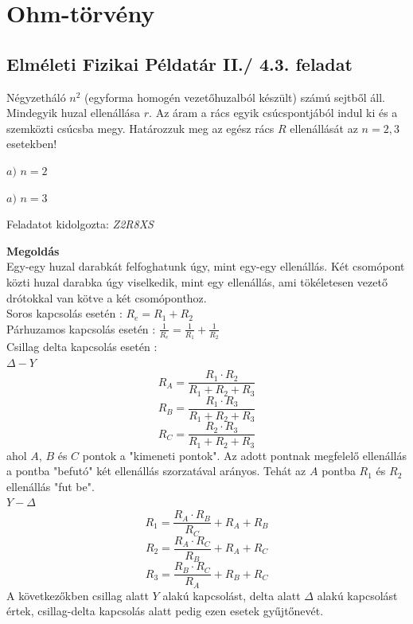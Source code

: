 \documentclass[11pt,a4paper,openany,leqno]{article}
\begin{document}
\section{Ohm-törvény}
\subsection{Elméleti Fizikai Példatár II./ 4.3. feladat}



Négyzetháló $n^2$ (egyforma homogén vezetőhuzalból készült) számú sejtből áll. Mindegyik huzal ellenállása $r$. Az áram a rács egyik csúcspontjából indul ki és a szemközti csúcsba megy. Határozzuk meg az egész rács $R$ ellenállását az $n = 2, 3$ esetekben!

\medskip
$a)$ $n = 2$

\medskip
$a)$ $n = 3$


\begin{flushright} {Feladatot kidolgozta: {\it Z2R8XS}} \end{flushright}

\vspace{0.5cm}

\textbf{Megoldás}\\
\indent
Egy-egy huzal darabkát felfoghatunk úgy, mint egy-egy ellenállás. Két csomópont közti huzal darabka úgy viselkedik, mint egy ellenállás, ami tökéletesen vezető drótokkal van kötve a két csomóponthoz.\\ \indent
Soros kapcsolás esetén : $R_e = R_1 + R_2$ \\ \indent
Párhuzamos kapcsolás esetén : $\frac{1}{R_e} = \frac{1}{R_1} + \frac{1}{R_2}$ \\ \indent
Csillag delta kapcsolás esetén : \\
\smallskip
\indent
$\Delta - Y$
$$ R_A = \frac{R_1 \cdot R_2}{R_1 + R_2 + R_3} $$
$$ R_B = \frac{R_1 \cdot R_3}{R_1 + R_2 + R_3} $$
$$ R_C = \frac{R_2 \cdot R_3}{R_1 + R_2 + R_3} $$ \indent
ahol $A$, $B$ és $C$ pontok a "kimeneti pontok". Az adott pontnak megfelelő ellenállás a pontba "befutó" két ellenállás szorzatával arányos. Tehát az $A$ pontba $R_1$ és $R_2$ ellenállás "fut be".\\ \indent
\smallskip
$Y- \Delta$
$$ R_1 = \frac{R_A \cdot R_B}{R_C} + R_A + R_B $$
$$ R_2 = \frac{R_A \cdot R_C}{R_B} + R_A + R_C $$
$$ R_3 = \frac{R_B \cdot R_C}{R_A} + R_B + R_C $$ \indent
A következőkben csillag alatt $Y$ alakú kapcsolást, delta alatt $\Delta$ alakú kapcsolást értek, csillag-delta kapcsolás alatt pedig ezen esetek gyűjtőnevét.
\medskip
\end{document}

